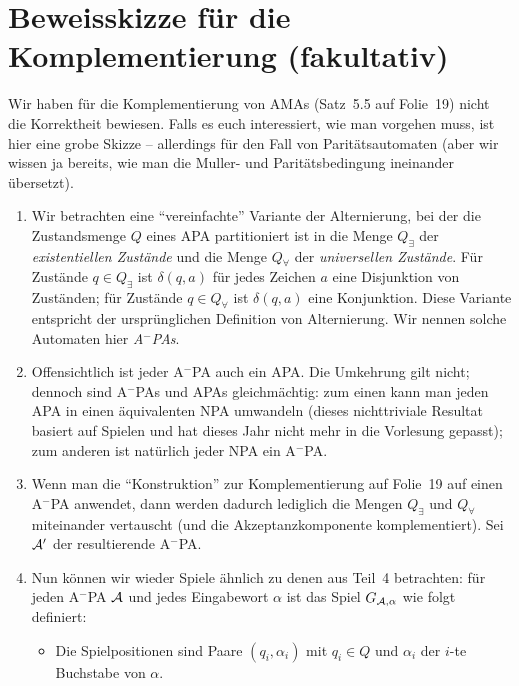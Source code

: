\documentclass[fontsize=11pt, twoside=false, numbers=autoenddot]{scrbook}
\begin{document}
\section*{Beweisskizze für die Komplementierung (fakultativ)}

Wir haben für die Komplementierung von AMAs (Satz~5.5 auf Folie~19)
nicht die Korrektheit bewiesen. Falls es euch interessiert,
wie man vorgehen muss,
ist hier eine grobe Skizze --
allerdings für den Fall von Paritätsautomaten
(aber wir wissen ja bereits,
wie man die Muller- und Paritätsbedingung ineinander übersetzt).

\begin{enumerate}
  \item
    Wir betrachten eine "`vereinfachte"' Variante der Alternierung,
    bei der die Zustandsmenge $Q$ eines APA partitioniert ist 
    in die Menge $Q_\exists$ der \emph{existentiellen Zustände}
    und die Menge $Q_\forall$ der \emph{universellen Zustände}.
    Für Zustände $q \in Q_\exists$ ist 
    $\delta(q,a)$ für jedes Zeichen $a$ eine Disjunktion von Zuständen;
    für Zustände $q \in Q_\forall$ ist 
    $\delta(q,a)$ eine Konjunktion.
    Diese Variante entspricht der ursprünglichen Definition
    von Alternierung.
    Wir nennen solche Automaten hier \emph{A${}^-$PAs}.
 \item
    Offensichtlich ist jeder A${}^-$PA auch ein APA.
    Die Umkehrung gilt nicht; dennoch sind A${}^-$PAs und APAs
    gleichmächtig: zum einen kann man jeden APA in einen äquivalenten NPA
    umwandeln  (dieses nichttriviale Resultat basiert auf Spielen
    und hat dieses Jahr nicht mehr in die Vorlesung gepasst);
    zum anderen ist natürlich jeder NPA ein A${}^-$PA.
 \item
    Wenn man die "`Konstruktion"' zur Komplementierung auf Folie~19
    auf einen A${}^-$PA anwendet, dann werden dadurch lediglich die Mengen
    $Q_\exists$ und $Q_\forall$ miteinander vertauscht
    (und die Akzeptanzkomponente komplementiert).
    Sei $\mathcal{A}'$ der resultierende A${}^-$PA.
  \item
    Nun können wir wieder Spiele ähnlich zu denen aus Teil~4 betrachten:
    für jeden A${}^-$PA $\mathcal{A}$ und jedes Eingabewort $\alpha$
    ist das Spiel $G_{\mathcal{A},\alpha}$ wie folgt definiert:
    \begin{itemize}
      \item
        Die Spielpositionen sind Paare $(q_i,\alpha_i)$ mit $q_i \in Q$
        und $\alpha_i$ der $i$-te Buchstabe von $\alpha$.

\end{itemize}
\end{enumerate}
\end{document}
